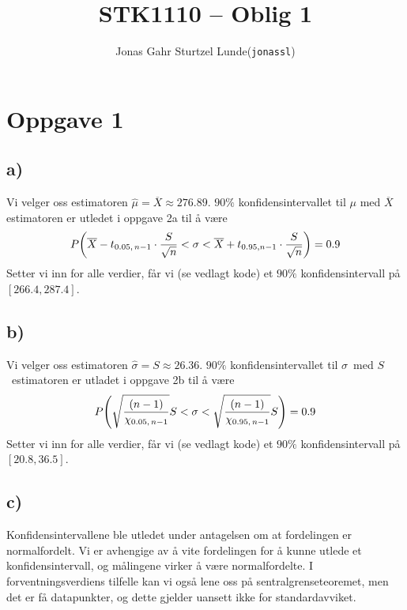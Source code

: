 \documentclass[12p,a4paper]{article}
\renewcommand{\bar}{\overline}
\begin{document}
\title{STK1110 -- Oblig 1}
\author{
    \begin{tabular}{r l}
        Jonas Gahr Sturtzel Lunde & (\texttt{jonassl})
    \end{tabular}}

\maketitle

\hspace{10cm}




\section*{Oppgave 1}
\subsection*{a)}
Vi velger oss estimatoren $\hat{\mu} = \bar{X} \approx 276.89$. $90\%$ konfidensintervallet til $\mu$ med $\bar{X}$ estimatoren er utledet i oppgave 2a til å være
\begin{equation}
    P\qty( \bar{X} - t_{0.05,\, n-1}\cdot\frac{S}{\sqrt{n}} < \sigma < \bar{X} + t_{0.95, n-1}\cdot\frac{S}{\sqrt{n}} ) = 0.9
\end{equation}
Setter vi inn for alle verdier, får vi (se vedlagt kode) et $90\%$ konfidensintervall på $[266.4, 287.4]$.


\subsection*{b)}
Vi velger oss estimatoren $\hat{\sigma} = S \approx 26.36$. $90\%$ konfidensintervallet til $\sigma$ med $S$ estimatoren er utladet i oppgave 2b til å være
\begin{equation}
    P\qty(\sqrt{\frac{(n-1)}{\chi_{0.05,\, n-1}}}S < \sigma < \sqrt{\frac{(n-1)}{\chi_{0.95,\, n-1}}}S) = 0.9
\end{equation}
Setter vi inn for alle verdier, får vi (se vedlagt kode) et $90\%$ konfidensintervall på $[20.8, 36.5]$.


\subsection*{c)}
Konfidensintervallene ble utledet under antagelsen om at fordelingen er normalfordelt. Vi er avhengige av å vite fordelingen for å kunne utlede et konfidensintervall, og målingene virker å være normalfordelte. I forventningsverdiens tilfelle kan vi også lene oss på sentralgrenseteoremet, men det er få datapunkter, og dette gjelder uansett ikke for standardavviket.
\end{document}
